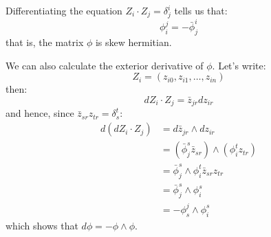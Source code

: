 \documentclass[11pt]{amsart}
\theoremstyle{definition}
\begin{document}
Differentiating the equation $ Z_i \cdot Z_j = \delta^i_j $ tells us that:
%
$$ \phi^j_i = - \bar{\phi}^i_j $$
%
that is, the matrix $\phi$ is skew hermitian. 

We can also calculate the exterior derivative of $\phi$.  Let's write:
%
$$ Z_i = ( z_{i0}, z_{i1}, \ldots, z_{in} ) $$
%
then:
%
$$ d Z_i \cdot Z_j = \bar{z}_{jr} d z_{ir} $$
%
and hence, since $\bar{z}_{sr} z_{tr} = \delta^t_s$:
%
\begin{align*}
d( d Z_i \cdot Z_j ) &= d \bar{z}_{jr} \wedge d z_{ir} \\
&= ( \bar{\phi}^s_j \bar{z}_{sr} ) \wedge ( \phi^t_i z_{tr} ) \\
&= \bar{\phi}^s_j \wedge \phi^t_i \bar{z}_{sr}  z_{tr} \\
&= \bar{\phi}^s_j \wedge \phi^s_i \\
&= - \phi^j_s \wedge \phi^s_i
\end{align*}
%
which shows that $d \phi = - \phi \wedge \phi $.   
\end{document}
